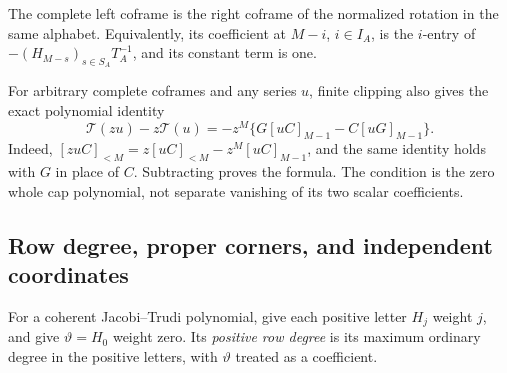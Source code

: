 \documentclass[11pt,a4paper]{amsart}
\numberwithin{equation}{section}
\theoremstyle{plain}
\theoremstyle{definition}
\begin{document}
The complete left coframe is the right coframe of the normalized
rotation in the same alphabet.  Equivalently, its coefficient at
\(M-i\), \(i\in I_A\), is the \(i\)-entry of
\(-(H_{M-s})_{s\in S_A}T_A^{-1}\), and its constant term is one.

For arbitrary complete coframes and any series \(u\), finite clipping
also gives the exact polynomial identity
\begin{equation}\label{sc:exact-shift-cap}
 \mathcal T(zu)-z\mathcal T(u)
 =-z^M\{G[uC]_{M-1}-C[uG]_{M-1}\}.
\end{equation}
Indeed, \([zuC]_{<M}=z[uC]_{<M}-z^M[uC]_{M-1}\),
and the same identity holds with \(G\) in place of \(C\).
Subtracting proves the formula.  The condition is the zero whole cap
polynomial, not separate vanishing of its two scalar coefficients.

\subsection{Row degree, proper corners, and independent coordinates}

For a coherent Jacobi--Trudi polynomial, give each positive letter
\(H_j\) weight \(j\), and give \(\vartheta=H_0\) weight zero.  Its \emph{positive
row degree} is its maximum ordinary degree in the positive letters,
with \(\vartheta\) treated as a coefficient.
\end{document}
